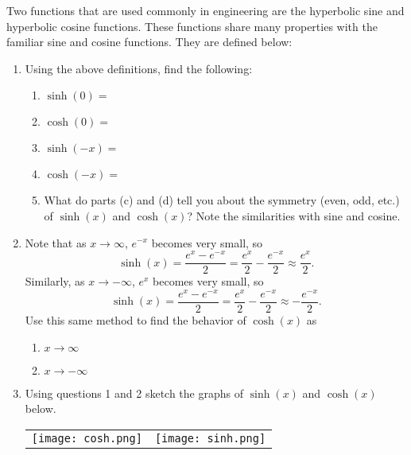 \documentclass[11pt]{article}
\begin{document}
\drawtitle

Two functions that are used commonly in engineering are the
hyperbolic sine and hyperbolic cosine functions. These functions share
many properties with the familiar sine and cosine functions. They are
defined below:

\begin{center}
\end{center}

\begin{enumerate}
\item Using the above definitions, find the following:
  \begin{enumerate}
  \item $\sinh(0)=$
    \vfill
  \item $\cosh(0)=$
    \vfill
  \item $\sinh(-x)=$
    \vfill
  \item $\cosh(-x)=$
    \vfill
  \item What do parts (c) and (d) tell you about the symmetry (even,
    odd, etc.) of $\sinh(x)$ and $\cosh(x)$?  Note the similarities
    with sine and cosine.
    \vfill\vfill
  \end{enumerate}

  \newpage

\item Note that as $x\rightarrow\infty$, $e^{-x}$ becomes very small,
  so
  \[
  \sinh(x) = \dfrac{e^x-e^{-x}}{2} = \dfrac{e^x}{2}-\dfrac{e^{-x}}{2}
  \approx \dfrac{e^x}{2}.
  \]
  Similarly, as $x\rightarrow -\infty$, $e^x$ becomes very small, so
  \[
  \sinh(x) = \dfrac{e^x-e^{-x}}{2} = \dfrac{e^x}{2}-\dfrac{e^{-x}}{2}
  \approx -\dfrac{e^{-x}}{2}.
  \]
  Use this same method to find the behavior of $\cosh(x)$ as
  \begin{enumerate}
  \item $x\to\infty$
    \vfill
  \item $x\to -\infty$
    \vfill
  \end{enumerate}

\item Using questions 1 and 2 sketch the graphs of $\sinh(x)$ and
  $\cosh(x)$ below.
  \begin{center}
    \begin{tabular}{cc}
      \texttt{[image: cosh.png]} &
      \texttt{[image: sinh.png]}
    \end{tabular}
  \end{center}


\end{enumerate}
\end{document}
